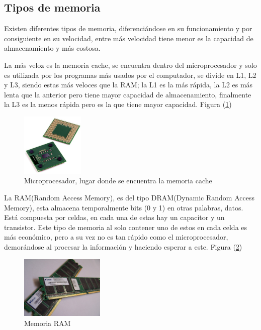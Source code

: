 \documentclass{article}
\begin{document}
\subsection{Tipos de memoria}

Existen diferentes tipos de memoria, diferenciándose en su funcionamiento y por consiguiente en su velocidad, entre más velocidad tiene menor es la capacidad de almacenamiento y más costosa.\newline

La más veloz es la memoria cache, se encuentra dentro del microprocesador y solo es utilizada por los programas más usados por el computador, se divide en L1, L2 y L3, siendo estas más veloces que la RAM; la L1 es la más rápida, la  L2 es más lenta que la anterior pero tiene mayor capacidad de almacenamiento, finalmente la L3 es la menos rápida pero es la que tiene mayor capacidad.
Figura (\ref{fig:Cache})\newline
\begin{figure}[h]
\includegraphics[width=3cm]{Cache.jpg}
\centering
\caption{Microprocesador, lugar donde se encuentra la memoria cache\cite{cache}}
\label{fig:Cache}
\end{figure}\newline
\newpage
La RAM(Random Access Memory), es del tipo DRAM(Dynamic Random Access Memory), esta almacena temporalmente bits (0 y 1) en otras palabras, datos. Está compuesta por celdas, en cada una de estas hay un capacitor y un transistor. Este tipo de memoria al solo contener uno de estos en cada celda es más económico, pero a su vez no es tan rápido como el microprocesador, demorándose al procesar la información y haciendo esperar a este.
Figura (\ref{fig:RAM})
\begin{figure}[h]
\includegraphics[width=4cm]{RAM.jpg}
\centering
\caption{Memoria RAM\cite{RAM}}
\label{fig:RAM}
\end{figure}\newline
\end{document}
